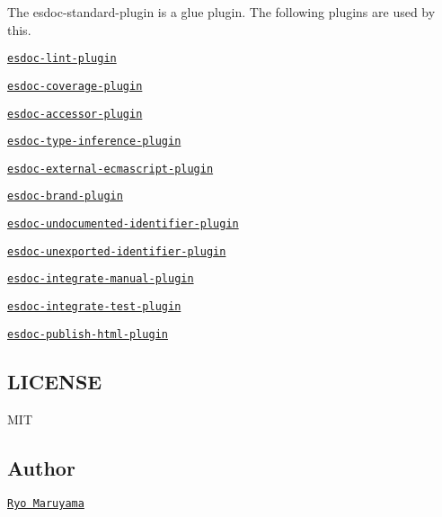The {\ttfamily esdoc-\/standard-\/plugin} is a glue plugin. The following plugins are used by this.
\begin{DoxyItemize}
\item \href{https://github.com/esdoc/esdoc-plugins/tree/master/esdoc-lint-plugin}{\tt esdoc-\/lint-\/plugin}
\item \href{https://github.com/esdoc/esdoc-plugins/tree/master/esdoc-coverage-plugin}{\tt esdoc-\/coverage-\/plugin}
\item \href{https://github.com/esdoc/esdoc-plugins/tree/master/esdoc-accessor-plugin}{\tt esdoc-\/accessor-\/plugin}
\item \href{https://github.com/esdoc/esdoc-plugins/tree/master/esdoc-type-inference-plugin}{\tt esdoc-\/type-\/inference-\/plugin}
\item \href{https://github.com/esdoc/esdoc-plugins/tree/master/esdoc-external-ecmascript-plugin}{\tt esdoc-\/external-\/ecmascript-\/plugin}
\item \href{https://github.com/esdoc/esdoc-plugins/tree/master/esdoc-brand-plugin}{\tt esdoc-\/brand-\/plugin}
\item \href{https://github.com/esdoc/esdoc-plugins/tree/master/esdoc-undocumented-identifier-plugin}{\tt esdoc-\/undocumented-\/identifier-\/plugin}
\item \href{https://github.com/esdoc/esdoc-plugins/tree/master/esdoc-unexported-identifier-plugin}{\tt esdoc-\/unexported-\/identifier-\/plugin}
\item \href{https://github.com/esdoc/esdoc-plugins/tree/master/esdoc-integrate-manual-plugin}{\tt esdoc-\/integrate-\/manual-\/plugin}
\item \href{https://github.com/esdoc/esdoc-plugins/tree/master/esdoc-integrate-test-plugin}{\tt esdoc-\/integrate-\/test-\/plugin}
\item \href{https://github.com/esdoc/esdoc-plugins/tree/master/esdoc-publish-html-plugin}{\tt esdoc-\/publish-\/html-\/plugin}
\end{DoxyItemize}

\subsection*{L\+I\+C\+E\+N\+SE}

M\+IT

\subsection*{Author}

\href{https://github.com/h13i32maru}{\tt Ryo Maruyama} 